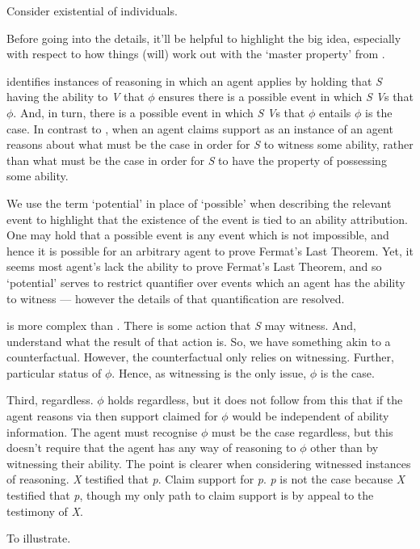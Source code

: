 \begin{note}[\WR{} def.]
{    Consider existential of individuals.
  }

  {
    \color{green}
    Before going into the details, it'll be helpful to highlight the big idea, especially with respect to how things (will) work out with the `master property' from \AR{}.
  }

  \WR{} identifies instances of reasoning in which an agent applies  by holding that \emph{S} having the ability to \emph{V} that \(\phi\) ensures there is a possible event in which \emph{S} \emph{V}s that \(\phi\).
  And, in turn, there is a possible event in which \emph{S} \emph{V}s that \(\phi\) entails \(\phi\) is the case.
  In contrast to \AR{}, when an agent claims support as an instance of \WR{} an agent reasons about what must be the case in order for \emph{S} to witness some ability, rather than what must be the case in order for \emph{S} to have the property of possessing some ability.


  We use the term `potential' in place of `possible' when describing the relevant event to highlight that the existence of the event is tied to an ability attribution.
  One may hold that a possible event is any event which is not impossible, and hence it is possible for an arbitrary agent to prove Fermat's Last Theorem.
  Yet, it seems most agent's lack the ability to prove Fermat's Last Theorem, and so `potential' serves to restrict quantifier over events which an agent has the ability to witness --- however the details of that quantification are resolved.

  {
    \color{red}
    \WR{} is more complex than \AR{}.
    There is some action that \emph{S} may witness.
    And, understand what the result of that action is.
    So, we have something akin to a counterfactual.
    However, the counterfactual only relies on witnessing.
    Further, particular status of \(\phi\).
    Hence, as witnessing is the only issue, \(\phi\) is the case.

    Third, regardless.
    \(\phi\) holds regardless, but it does not follow from this that if the agent reasons via \WR{} then support claimed for \(\phi\) would be independent of ability information.
    The agent must recognise \(\phi\) must be the case regardless, but this doesn't require that the agent has any way of reasoning to \(\phi\) other than by witnessing their ability.
    The point is clearer when considering witnessed instances of reasoning.
    \emph{X} testified that \emph{p}.
    Claim support for \emph{p}.
    \emph{p} is not the case because \emph{X} testified that \emph{p}, though my only path to claim support is by appeal to the testimony of \emph{X}.
  }
  To illustrate.


\end{note}
